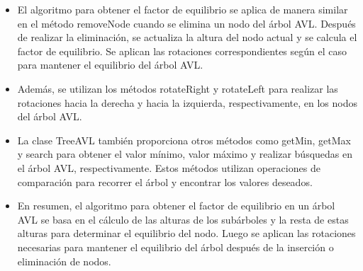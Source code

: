 \documentclass{article}
\begin{document}
\begin{itemize}
		\item El algoritmo para obtener el factor de equilibrio se aplica de manera similar en el método removeNode cuando se elimina un nodo del árbol AVL. Después de realizar la eliminación, se actualiza la altura del nodo actual y se calcula el factor de equilibrio. Se aplican las rotaciones correspondientes según el caso para mantener el equilibrio del árbol AVL.
		\item Además, se utilizan los métodos rotateRight y rotateLeft para realizar las rotaciones hacia la derecha y hacia la izquierda, respectivamente, en los nodos del árbol AVL.
		\item La clase TreeAVL también proporciona otros métodos como getMin, getMax y search para obtener el valor mínimo, valor máximo y realizar búsquedas en el árbol AVL, respectivamente. Estos métodos utilizan operaciones de comparación para recorrer el árbol y encontrar los valores deseados.
		\item En resumen, el algoritmo para obtener el factor de equilibrio en un árbol AVL se basa en el cálculo de las alturas de los subárboles y la resta de estas alturas para determinar el equilibrio del nodo. Luego se aplican las rotaciones necesarias para mantener el equilibrio del árbol después de la inserción o eliminación de nodos.
	\end{itemize}	

	
\end{document}
